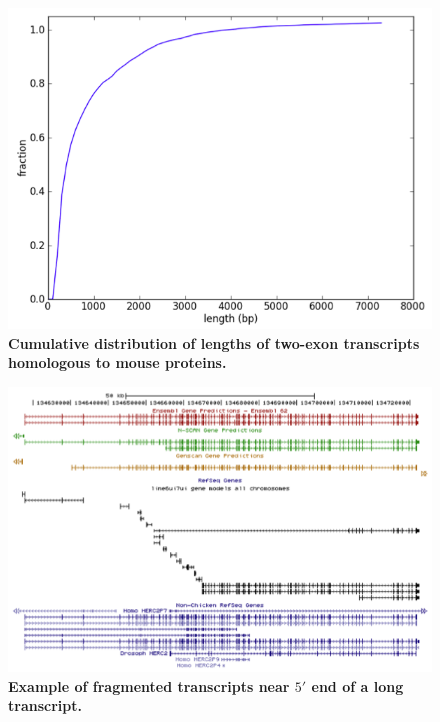 \documentclass[10pt]{article}
\begin{document}
\begin{figure}[!ht]
\begin{center}
\includegraphics[width=5in]{figure8.png}
\end{center}
\caption{
{\bf Cumulative distribution of lengths of two-exon transcripts homologous to mouse proteins.}
}
\label{figure8}
\end{figure}

\begin{figure}[!ht]
\begin{center}
\includegraphics[width=5in]{figure9.png}
\end{center}
\caption{
{\bf Example of fragmented transcripts near $5'$ end of a long transcript.}
}
\label{figure9}
\end{figure}
\end{document}
